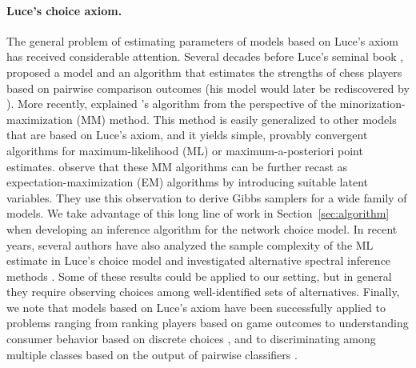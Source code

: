 \paragraph{Luce's choice axiom.}
The general problem of estimating parameters of models based on Luce's axiom has received considerable attention.
Several decades before Luce's seminal book \citep{luce1959individual}, \citet{zermelo1928berechnung} proposed a model and an algorithm that estimates the strengths of chess players based on pairwise comparison outcomes (his model would later be rediscovered by \citet{bradley1952rank}).
More recently, \citet{hunter2004mm} explained \citeauthor{zermelo1928berechnung}'s algorithm from the perspective of the minorization-maximization (MM) method.
This method is easily generalized to other models that are based on Luce's axiom, and it yields simple, provably convergent algorithms for maximum-likelihood (ML) or maximum-a-posteriori point estimates.
\citet{caron2012efficient} observe that these MM algorithms can be further recast as expectation-maximization (EM) algorithms by introducing suitable latent variables.
They use this observation to derive Gibbs samplers for a wide family of models.
We take advantage of this long line of work in Section~\ref{sec:algorithm} when developing an inference algorithm for the network choice model.
In recent years, several authors have also analyzed the sample complexity of the ML estimate in Luce's choice model \citep{hajek2014minimax, vojnovic2016parameter} and investigated alternative spectral inference methods \citep{negahban2012iterative, azari2013generalized, maystre2015fast}.
Some of these results could be applied to our setting, but in general they require observing choices among well-identified sets of alternatives.
Finally, we note that models based on Luce's axiom have been successfully applied to problems ranging from ranking players based on game outcomes \citep{zermelo1928berechnung, elo1978rating} to understanding consumer behavior based on discrete choices \citep{mcfadden1973conditional}, and to discriminating among multiple classes based on the output of pairwise classifiers \citep{hastie1998classification}.

